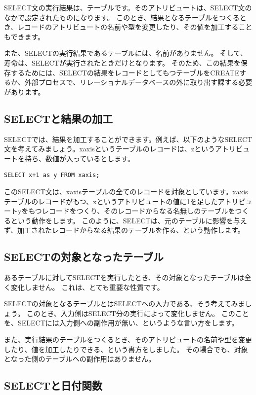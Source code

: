 SELECT文の実行結果は、テーブルです。そのアトリビュートは、SELECT文のなかで設定されたものになります。
このとき、結果となるテーブルをつくるとき、レコードのアトリビュートの名前や型を変更したり、その値を加工することもできます。

また、SELECTの実行結果であるテーブルには、名前がありません。
そして、寿命は、SELECTが実行されたときだけとなります。
そのため、この結果を保存するためには、SELECTの結果をレコードとしてもつテーブルをCREATEするか、外部プロセスで、リレーショナルデータベースの外に取り出す課する必要があります。

\subsection{SELECTと結果の加工}

SELECTでは、結果を加工することができます。例えば、以下のようなSELECT文を考えてみましょう。xaxisというテーブルのレコードは、zというアトリビュートを持ち、数値が入っているとします。

\begin{verbatim}
SELECT x+1 as y FROM xaxis;
\end{verbatim}

このSELECT文は、xaxisテーブルの全てのレコードを対象としています。xaxisテーブルのレコードがもつ、xというアトリビュートの値に1を足したアトリビュートyをもつレコードをつくり、そのレコードからなる名無しのテーブルをつくるという動作をします。
このように、SELECTは、元のテーブルに影響を与えず、加工されたレコードからなる結果のテーブルを作る、という動作します。

\subsection{SELECTの対象となったテーブル}

あるテーブルに対してSELECTを実行したとき、その対象となったテーブルは全く変化しません。
これは、とても重要な性質です。

SELECTの対象となるテーブルとはSELECTへの入力である、そう考えてみましょう。
このとき、入力側はSELECT分の実行によって変化しません。
このことを、SELECTには入力側への副作用が無い、というような言い方をします。

また、実行結果のテーブルをつくるとき、そのアトリビュートの名前や型を変更したり、値を加工したりできる、という書方をしました。
その場合でも、対象となった側のテーブルへの副作用はありません。

\subsection{SELECTと日付関数}

